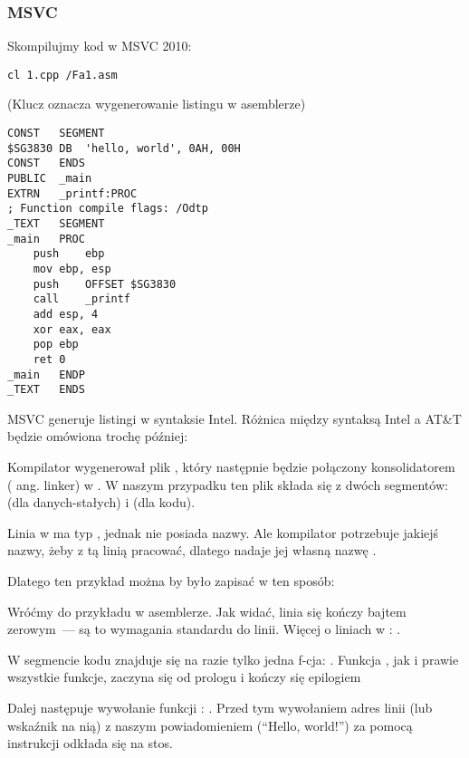 \subsubsection{MSVC}

Skompilujmy kod w MSVC 2010:

\begin{lstlisting}
cl 1.cpp /Fa1.asm
\end{lstlisting}

(Klucz  oznacza wygenerowanie listingu w asemblerze)

\begin{lstlisting}[caption=MSVC 2010,style=customasmx86]
CONST	SEGMENT
$SG3830	DB	'hello, world', 0AH, 00H
CONST	ENDS
PUBLIC	_main
EXTRN	_printf:PROC
; Function compile flags: /Odtp
_TEXT	SEGMENT
_main	PROC
	push	ebp
	mov	ebp, esp
	push	OFFSET $SG3830
	call	_printf
	add	esp, 4
	xor	eax, eax
	pop	ebp
	ret	0
_main	ENDP
_TEXT	ENDS
\end{lstlisting}

MSVC generuje listingi w syntaksie Intel.
Różnica między syntaksą Intel a AT\&T będzie omówiona trochę później:

Kompilator wygenerował plik , który następnie będzie połączony konsolidatorem ( ang. linker) w .
W naszym przypadku ten plik składa się z dwóch segmentów:  (dla danych-stałych) i  (dla kodu).

\label{string_is_const_char}
Linia  w \CCpp ma typ , jednak nie posiada nazwy.
Ale kompilator potrzebuje jakiejś nazwy, żeby z tą linią pracować, dlatego nadaje jej własną nazwę .

Dlatego ten przykład można by było zapisać w ten sposób:



Wróćmy do przykładu w asemblerze. Jak widać, linia się kończy bajtem zerowym~--- są to wymagania standardu \CCpp do linii.
Więcej o liniach w \CCpp: .

W segmencie kodu  znajduje się na razie tylko jedna f-cja: \main{}.
Funkcja \main, jak i prawie wszystkie funkcje, zaczyna się od prologu i kończy się epilogiem

Dalej następuje wywołanie funkcji \printf{}: .
Przed tym wywołaniem adres linii (lub wskaźnik na nią) z naszym powiadomieniem (``Hello, world!'') za pomocą instrukcji \PUSH odkłada się na stos.

